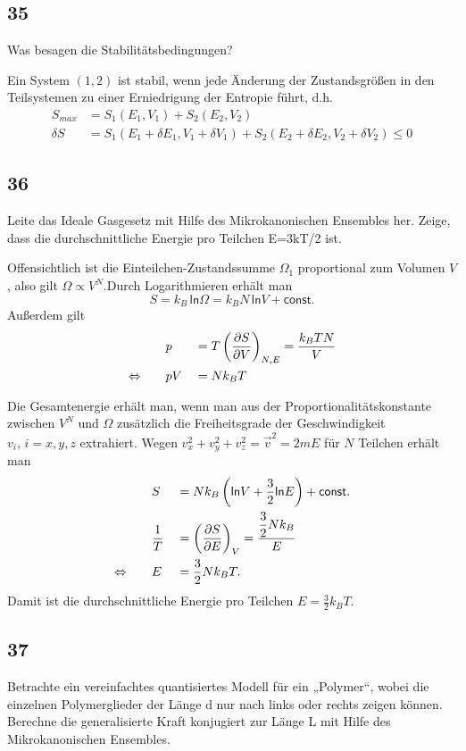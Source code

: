 \documentclass[12pt,a4paper]{report}
\newcommand{\logn}{\mathsf{ln}}
\newcommand{\partddd}[3]{\ensuremath {\left(\frac{\partial #1}{\partial #2}}\right)_{#3}}
\newcommand{\const}{\mathsf{const.}}
\newenvironment{myfrag}{\begin{it}}{\end{it}\vspace{3mm}\par}
\numberwithin{equation}{section}
\begin{document}
\subsection{35}
\begin{myfrag}
Was besagen die Stabilitätsbedingungen?
\end{myfrag}
Ein System $(1,2)$ ist stabil, wenn jede Änderung der Zustandsgrößen in den Teilsystemen zu einer Erniedrigung der Entropie führt, d.h.
\begin{align}
	S_{max}&=S_1(E_1,V_1)+S_2(E_2,V_2)\\
	\delta S&=S_1(E_1+\delta E_1,V_1+\delta V_1)+S_2(E_2+\delta E_2,V_2+\delta V_2)\le 0
\end{align}
\subsection{36}
\begin{myfrag}
Leite das Ideale Gasgesetz mit Hilfe des Mikrokanonischen Ensembles her.
Zeige, dass die durchschnittliche Energie pro Teilchen E=3kT/2 ist.
\end{myfrag}
Offensichtlich ist die Einteilchen-Zustandssumme $\Omega_1$ proportional zum Volumen $V$, also gilt $\Omega\propto V^N$.Durch Logarithmieren erhält man
\begin{equation}
	S=k_B\,\logn\Omega=k_BN\,\logn V+\const
\end{equation}
Außerdem gilt
\begin{alignat}{2}
	&p&&=T\partddd SV{N,E}=\frac{k_BTN}{V}\\
	\Leftrightarrow\qquad&pV&&=Nk_BT
\end{alignat}
\par Die Gesamtenergie erhält man, wenn man aus der Proportionalitätskonstante zwischen $V^N$ und $\Omega$ zusätzlich die Freiheitsgrade der Geschwindigkeit $v_i,\,i=x,y,z$ extrahiert. Wegen $v_x^2+v_y^2+v_z^2=\vec{v}^2=2mE$ für $N$ Teilchen erhält man
\begin{alignat}{2}
	&S&&=Nk_B\left(\logn V+\frac{3}{2}\logn E\right)+\const\\
	&\frac{1}{T}&&=\partddd SEV=\frac{\dfrac{3}{2}Nk_B}{E}\\
	\Leftrightarrow\qquad&E&&=\frac{3}{2}Nk_BT.
\end{alignat}
Damit ist die durchschnittliche Energie pro Teilchen $E=\frac{3}{2}k_BT$.
\subsection{37}
\begin{myfrag}
Betrachte ein vereinfachtes quantisiertes Modell für ein „Polymer“, wobei die
einzelnen Polymerglieder der Länge d nur nach links oder rechts zeigen können.
Berechne die generalisierte Kraft konjugiert zur Länge L mit Hilfe des
Mikrokanonischen Ensembles.
\end{myfrag}
\end{document}
